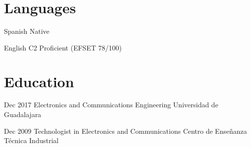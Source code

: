 \documentclass{resume} %
\begin{document}


\section{Languages}


\langitem
    {Spanish}
    {Native}


\langitem
    {English}
    {C2 Proficient (EFSET 78/100)}




\section{Education}


\eduitem
    {Dec 2017}
    {Electronics and Communications Engineering}
    {Universidad de Guadalajara}


\eduitem
    {Dec 2009}
    {Technologist in Electronics and Communications}
    {Centro de Enseñanza Técnica Industrial}


\end{document}
